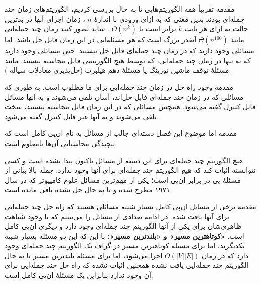 \begin{itemframe}{مقدمه}
\itm
تقریباً همه الگوریتم‌هایی تا به حال بررسی کردیم، الگوریتم‌های زمان چند جمله‌ای
 بودند بدین معنی که به ازای ورودی با اندازهٔ
$n$
، زمان اجرای آنها در بدترین حالت به ازای هر ثابت
$k$
برابر است با
$O(n^k)$ .
\itm
شاید تصور کنید زمان چند جمله‌ایی مانند
$\Theta(n^{100})$
آنقدر بزرگ است که هر مسئله‌ایی در این زمان قابل حل باشد. اما مسائلی وجود دارند که در زمان چند جمله‌ای قابل حل نیستند.
\itm
حتی مسائلی وجود دارند که نه تنها در زمان چند جمله‌ایی،‌ که توسط هیچ الگوریتمی قابل محاسبه نیستند.
مانند مسئلهٔ توقف ماشین تورینگ
یا مسئلهٔ دهم هیلبرت (حل‌پذیری معادلات سیاله
).
\end{itemframe}

\begin{itemframe}{مقدمه}
\itm
وجود راه حل در زمان چند جمله‌ایی برای ما مطلوب است.
\sub
به طوری که مسائلی که در زمان چند جمله‌ای قابل حل‌اند، آسان تلقی می‌شوند و به آنها مسائل قابل کنترل
 گفته می‌شود.
\sub
 همچنین مسائلی که در این زمان قابل محاسبه نیستند، سخت تلقی می‌شوند و به آنها غیر قابل کنترل
گفته می‌شود.
\end{itemframe}

\begin{itemframe}{مقدمه}
\itm
اما موضوع این فصل دسته‌ای جالب از مسائل به نام ان‌پی کامل
است که پیچیدگی محاسباتی آن‌ها نامعلوم است.

\itm
هیچ الگوریتم چند جمله‌ای برای این دسته از مسائل تاکنون پیدا نشده است و کسی نتوانسته اثبات کند که هیچ الگوریتم چند جمله‌ای برای آنها وجود ندارد.
\itm
جمله بالا بیانی از مسئلهٔ پی در برابر ان‌پی
است؛ یکی از مهم‌ترین مسائل علوم کامپیوتر که در سال ۱۹۷۱ مطرح شده و تا به حال حل نشده باقی مانده است.
\end{itemframe}

\begin{itemframe}{مقدمه}
\itm
برخی از مسائل ان‌پی کامل بسیار شبیه مسائلی هستند که راه حل چند جمله‌ایی برای آنها یافت شده. در ادامه تعدادی از مسائل را می‌بینیم که با وجود شباهت ظاهری‌شان برای یکی از آنها الگوریتم چند جمله‌ای وجود دارد و دیگری ان‌پی کامل است.
\itm
\textbf{«کوتاهترین مسیر» و «بلندترین مسیر»:}
با این که این دو مسئله بسیار شبیه یکدیگرند، اما برای مسئله کوتاهترین مسیر در گراف یک الگوریتم چند جمله‌ای وجود دارد که در زمان
$O(|V||E|)$
 اجرا می‌شود، اما برای مسئله بلندترین مسیر تا به حال الگوریتم چند جمله‌ایی یافت نشده همچنین اثبات نشده که راه حل چند جمله‌ایی برای آن وجود ندارد بنابراین یک مسئلهٔ ان‌پی کامل است.
\end{itemframe}


